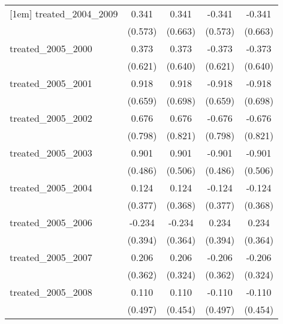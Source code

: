 {\begin{tabular}{l*{4}{c}}
[1em]
treated\_2004\_2009&       0.341         &       0.341         &      -0.341         &      -0.341         \\
            &     (0.573)         &     (0.663)         &     (0.573)         &     (0.663)         \\
[1em]
treated\_2005\_2000&       0.373         &       0.373         &      -0.373         &      -0.373         \\
            &     (0.621)         &     (0.640)         &     (0.621)         &     (0.640)         \\
[1em]
treated\_2005\_2001&       0.918         &       0.918         &      -0.918         &      -0.918         \\
            &     (0.659)         &     (0.698)         &     (0.659)         &     (0.698)         \\
[1em]
treated\_2005\_2002&       0.676         &       0.676         &      -0.676         &      -0.676         \\
            &     (0.798)         &     (0.821)         &     (0.798)         &     (0.821)         \\
[1em]
treated\_2005\_2003&       0.901         &       0.901         &      -0.901         &      -0.901         \\
            &     (0.486)         &     (0.506)         &     (0.486)         &     (0.506)         \\
[1em]
treated\_2005\_2004&       0.124         &       0.124         &      -0.124         &      -0.124         \\
            &     (0.377)         &     (0.368)         &     (0.377)         &     (0.368)         \\
[1em]
treated\_2005\_2006&      -0.234         &      -0.234         &       0.234         &       0.234         \\
            &     (0.394)         &     (0.364)         &     (0.394)         &     (0.364)         \\
[1em]
treated\_2005\_2007&       0.206         &       0.206         &      -0.206         &      -0.206         \\
            &     (0.362)         &     (0.324)         &     (0.362)         &     (0.324)         \\
[1em]
treated\_2005\_2008&       0.110         &       0.110         &      -0.110         &      -0.110         \\
            &     (0.497)         &     (0.454)         &     (0.497)         &     (0.454)         \\

\end{tabular}}
